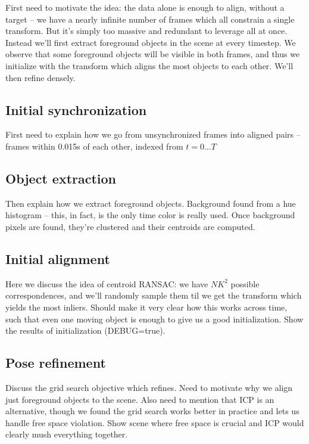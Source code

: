 \documentclass[letterpaper, 10 pt, conference]{ieeeconf}  %
\begin{document}
First need to motivate the idea: the data alone is enough to align, without a target -- we have a nearly infinite number of frames which all constrain a single transform. But it's simply too massive 
and redundant to leverage all at once. Instead we'll first extract foreground objects in the scene at every timestep. 
We observe that some foreground objects will be visible in both frames, and thus we initialize with the transform which aligns the most objects to each other. We'll then refine densely.

\subsection{Initial synchronization}
First need to explain how we go from unsynchronized frames into aligned pairs -- frames within 0.015s of each other, indexed from $t = 0{\dots}T$

\subsection{Object extraction}
Then explain how we extract foreground objects. Background found from a hue histogram -- this, in fact, is the 
only time color is really used. Once background pixels are found, they're clustered and their centroids are 
computed.

\subsection{Initial alignment}
Here we discuss the idea of centroid RANSAC: we have $NK^2$ possible correspondences, and we'll randomly sample
them til we get the transform which yields the most inliers. Should make it very clear how this works across 
time, such that even one moving object is enough to give us a good initialization. Show the results of 
initialization (DEBUG=true).

\subsection{Pose refinement}
Discuss the grid search objective which refines. Need to motivate why we align just foreground objects to the scene. 
Also need to mention that ICP is an alternative, though we found the grid search works better in practice and lets 
us handle free space violation. Show scene where free space is crucial and ICP would clearly mush everything 
together.
\end{document}
